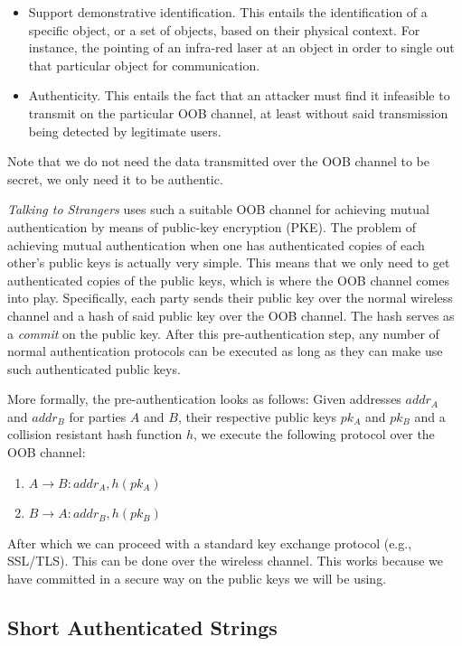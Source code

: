 \documentclass[conference, 11pt]{sty/IEEEtran}
\newlength{\arrow}
\begin{document}
\begin{itemize}
    \item Support demonstrative identification.
        This entails the identification of a specific object, or a set of objects, based on their physical context.
        For instance, the pointing of an infra-red laser at an object in order to single out that particular object for communication.
    \item Authenticity.
        This entails the fact that an attacker must find it infeasible to transmit on the particular OOB channel, at least without said transmission being detected by legitimate users.
\end{itemize}

Note that we do not need the data transmitted over the OOB channel to be secret, we only need it to be authentic.

\emph{Talking to Strangers} uses such a suitable OOB channel for achieving mutual authentication by means of public-key encryption (PKE).
The problem of achieving mutual authentication when one has authenticated copies of each other's public keys is actually very simple.
This means that we only need to get authenticated copies of the public keys, which is where the OOB channel comes into play.
Specifically, each party sends their public key over the normal wireless channel and a hash of said public key over the OOB channel.
The hash serves as a \emph{commit} on the public key.
After this pre-authentication step, any number of normal authentication protocols can be executed as long as they can make use such authenticated public keys.

More formally, the pre-authentication looks as follows:
Given addresses $addr_A$ and $addr_B$ for parties $A$ and $B$, their respective public keys $pk_A$ and $pk_B$ and a collision resistant hash function $h$, we execute the following protocol over the OOB channel:

\begin{enumerate}
    \item $A \rightarrow B: addr_A, h(pk_A)$
    \item $B \rightarrow A: addr_B, h(pk_B)$
\end{enumerate}

After which we can proceed with a standard key exchange protocol (e.g., SSL/TLS).
This can be done over the wireless channel.
This works because we have committed in a secure way on the public keys we will be using.

\subsection{Short Authenticated Strings}
\label{ssec:short_authenticated_strings}
\end{document}

